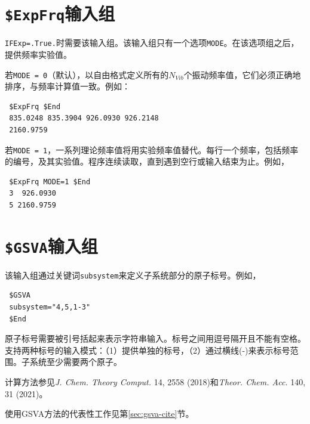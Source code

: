 \documentclass[12pt,a4paper,openany,twoside,cap,UTF8]{ctexbook}
\begin{document}
\section{\texttt{\$ExpFrq}输入组} \label{sec:inp-expfrq}

\verb|IFExp=.True.|时需要该输入组。该输入组只有一个选项\verb|MODE|。在该选项组之后，提供频率实验值。

\bigskip{}\noindent
若\verb|MODE = 0|（默认），以自由格式定义所有的$N_{Vib}$个振动频率值，它们必须正确地排序，与频率计算值一致。例如：
\begin{colorboxed}[oval=false,boxcolor=blue!75!black,bgcolor=blue!5!white]
\ttfamily
\begin{lstlisting}
 $ExpFrq $End
 835.0248 835.3904 926.0930 926.2148
 2160.9759
\end{lstlisting}\end{colorboxed}

\noindent
若\verb|MODE = 1|，一系列理论频率值将用实验频率值替代。每行一个频率，包括频率的编号，及其实验值。程序连续读取，直到遇到空行或输入结束为止。例如，
\begin{colorboxed}[oval=false,boxcolor=blue!75!black,bgcolor=blue!5!white]
\ttfamily
\begin{lstlisting}
 $ExpFrq MODE=1 $End
 3  926.0930
 5 2160.9759
\end{lstlisting}\end{colorboxed}


\section{\texttt{\$GSVA}输入组} \label{sec:inp-gsva}

该输入组通过关键词\verb|subsystem|来定义子系统部分的原子标号。例如，
\begin{colorboxed}[oval=false,boxcolor=blue!75!black,bgcolor=blue!5!white]
\ttfamily
\begin{lstlisting}
 $GSVA
 subsystem="4,5,1-3"
 $End
\end{lstlisting}\end{colorboxed}

原子标号需要被引号括起来表示字符串输入。标号之间用逗号隔开且不能有空格。支持两种标号的输入模式：（1）提供单独的标号，（2）通过横线(-)来表示标号范围。子系统至少需要两个原子。

计算方法参见\textit{J. Chem. Theory Comput.} 14, 2558 (2018)和\textit{Theor. Chem. Acc.} 140, 31 (2021)。

使用GSVA方法的代表性工作见第\ref{sec:gsva-cite}节。
\end{document}
